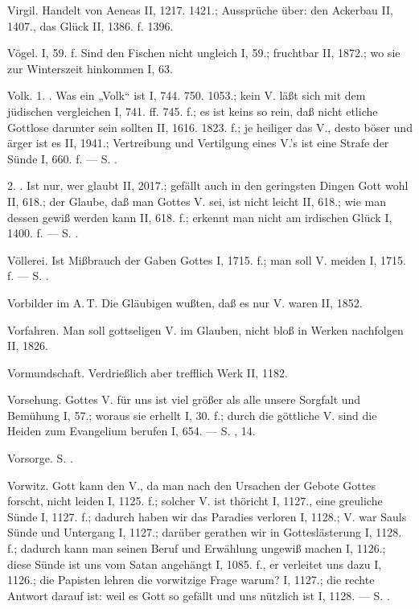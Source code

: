 Virgil. Handelt von Aeneas II, 1217. 1421.; Aussprüche über: den Ackerbau II, 1407., das Glück II, 1386. f. 1396.

Vögel. I, 59. f. Sind den Fischen nicht ungleich I, 59.; fruchtbar II, 1872.; wo sie zur Winterszeit hinkommen I, 63.

Volk. 1. . Was ein „Volk“ ist I, 744. 750. 1053.; kein V. läßt sich mit dem jüdischen vergleichen I, 741. ff. 745. f.; es ist keins so rein, daß nicht etliche Gottlose darunter sein sollten II, 1616. 1823. f.; je heiliger das V., desto böser und ärger ist es II, 1941.; Vertreibung und Vertilgung eines V.’s ist eine Strafe der Sünde I, 660. f. — S. .

2. . Ist nur, wer glaubt II, 2017.; gefällt auch in den geringsten Dingen Gott wohl II, 618.; der Glaube, daß man Gottes V. sei, ist nicht leicht II, 618.; wie man dessen gewiß werden kann II, 618. f.; erkennt man nicht am irdischen Glück I, 1400. f. — S. .

Völlerei. Ist Mißbrauch der Gaben Gottes I, 1715. f.; man soll V. meiden I, 1715. f. — S. .

Vorbilder im A.\,T. Die Gläubigen wußten, daß es nur V. waren II, 1852.

Vorfahren. Man soll gottseligen V. im Glauben, nicht bloß in Werken nachfolgen II, 1826.

Vormundschaft. Verdrießlich aber trefflich Werk II, 1182.

Vorsehung. Gottes V. für uns ist viel größer als alle unsere Sorgfalt und Bemühung I, 57.; woraus sie erhellt I, 30. f.; durch die göttliche V. sind die Heiden zum Evangelium berufen I, 654. — S. ,  14.

Vorsorge. S. .

Vorwitz. Gott kann den V., da man nach den Ursachen der Gebote Gottes forscht, nicht leiden I, 1125. f.; solcher V. ist thöricht I, 1127., eine greuliche Sünde I, 1127. f.; dadurch haben wir das Paradies verloren I, 1128.; V. war Sauls Sünde und Untergang I, 1127.; darüber gerathen wir in Gotteslästerung I, 1128. f.; dadurch kann man seinen Beruf und Erwählung ungewiß machen I, 1126.; diese Sünde ist uns vom Satan angehängt I, 1085. f., er verleitet uns dazu I, 1126.; die Papisten lehren die vorwitzige Frage warum? I, 1127.; die rechte Antwort darauf ist: weil es Gott so gefällt und uns nützlich ist I, 1128. — S. .

